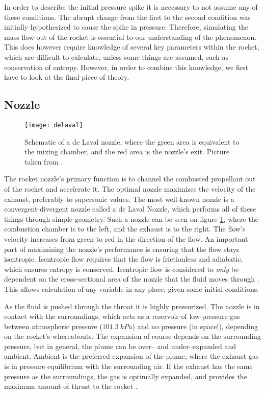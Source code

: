 	In order to describe the initial pressure spike it is necessary to not assume any of these conditions. The abrupt change from the first to the second condition was initially hypothesized to cause the spike in pressure. Therefore, simulating the mass flow out of the rocket is essential to our understanding of the phenomenon. This does however require knowledge of several key parameters within the rocket, which are difficult to calculate, unless some things are assumed, such as conservation of entropy. However, in order to combine this knowledge, we first have to look at the final piece of theory.

\subsection{Nozzle}

	\begin{figure}
		\texttt{[image: delaval]}
		\caption{Schematic of a de Laval nozzle, where the green area is equivalent to the mixing chamber, and the red area is the nozzle's exit. Picture taken from \cite{wikidelaval}.}
		\label{fig:delaval}
	\end{figure}

	The rocket nozzle's primary function is to channel the combusted propellant out of the rocket and accelerate it. The optimal nozzle maximizes the velocity of the exhaust, preferably to supersonic values. The most well-known nozzle is a convergent-divergent nozzle called a de Laval Nozzle, which performs all of these things through simple geometry. Such a nozzle can be seen on figure \ref{fig:delaval}, where the combustion chamber is to the left, and the exhaust is to the right. The flow's velocity increases from green to red in the direction of the flow. An important part of maximizing the nozzle's performance is ensuring that the flow stays isentropic. Isentropic flow requires that the flow is frictionless and adiabatic, which ensures entropy is conserved. Isentropic flow is considered to \emph{only} be dependent on the cross-sectional area of the nozzle that the fluid moves through \cite{nakkanozz}. This allows calculation of any variable in any place, given some initial conditions.

	As the fluid is pushed through the throat it is highly pressurized. The nozzle is in contact with the surroundings, which acts as a reservoir of low-pressure gas between atmospheric pressure ($\SI{101.3}{kPa}$)
	and no pressure (in space!), depending on the rocket's whereabouts. The expansion of course depends on the surrounding pressure, but in general, the plume can be over-- and under--expanded and ambient. Ambient is the preferred expansion of the plume, where the exhaust gas is in pressure equilibrium with the surrounding air. If the exhaust has the same pressure as the surroundings, the gas is optimally expanded, and provides the maximum amount of thrust to the rocket \cite{robertnozzle}.

